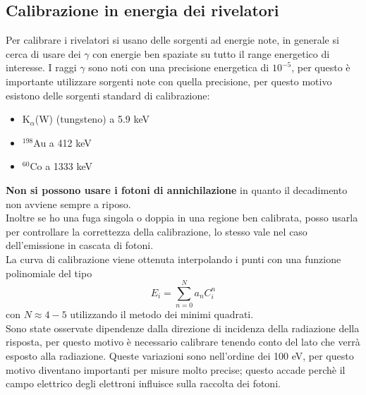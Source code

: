 \subsection{Calibrazione in energia dei rivelatori}
Per calibrare i rivelatori si usano delle sorgenti ad energie note, in generale si cerca di usare dei $\gamma$ con energie ben spaziate
su tutto il range energetico di interesse.
I raggi $\gamma$ sono noti con una precisione energetica di $10^{-5}$, per questo \`e importante utilizzare sorgenti note con quella
precisione, per questo motivo esistono delle sorgenti standard di calibrazione:
\begin{itemize}
\item K$_{\alpha}$(W) (tungsteno) a 5.9 keV
\item $^{198}$Au a 412 keV
\item $^{60}$Co a 1333 keV
\end{itemize}
\textbf{Non si possono usare i fotoni di annichilazione} in quanto il decadimento non avviene sempre a riposo.\\
Inoltre se ho una fuga singola o doppia in una regione ben calibrata, posso usarla per controllare la correttezza della calibrazione,
lo stesso vale nel caso dell'emissione in cascata di fotoni.\\
La curva di calibrazione viene ottenuta interpolando i punti con una funzione polinomiale del tipo
\begin{equation*}
E_i = \sum_{n=0}^N a_n C_i^n
\end{equation*}
con $N \approx 4-5$ utilizzando il metodo dei minimi quadrati.\\
Sono state osservate dipendenze dalla direzione di incidenza della radiazione della risposta, per questo motivo \`e necessario calibrare
tenendo conto del lato che verr\`a esposto alla radiazione. 
Queste variazioni sono nell'ordine dei 100 eV, per questo motivo diventano importanti per misure molto precise;
questo accade perch\`e il campo elettrico degli elettroni influisce sulla raccolta dei fotoni.
